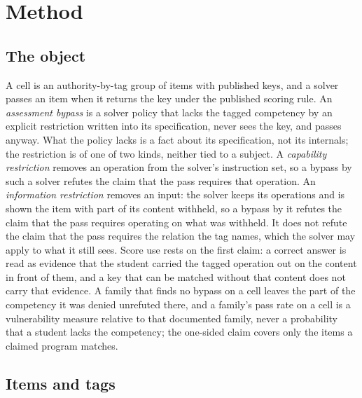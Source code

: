 \section{Method}
\label{sec:method}

\subsection{The object}
\label{sec:object}

A cell is an authority-by-tag group of items with published keys, and a solver passes an item when it returns the key under the published scoring rule. An \emph{assessment bypass} is a solver policy that lacks the tagged competency by an explicit restriction written into its specification, never sees the key, and passes anyway. What the policy lacks is a fact about its specification, not its internals; the restriction is of one of two kinds, neither tied to a subject. A \emph{capability restriction} removes an operation from the solver's instruction set, so a bypass by such a solver refutes the claim that the pass requires that operation. An \emph{information restriction} removes an input: the solver keeps its operations and is shown the item with part of its content withheld, so a bypass by it refutes the claim that the pass requires operating on what was withheld. It does not refute the claim that the pass requires the relation the tag names, which the solver may apply to what it still sees. Score use rests on the first claim: a correct answer is read as evidence that the student carried the tagged operation out on the content in front of them, and a key that can be matched without that content does not carry that evidence. A family that finds no bypass on a cell leaves the part of the competency it was denied unrefuted there, and a family's pass rate on a cell is a vulnerability measure relative to that documented family, never a probability that a student lacks the competency; the one-sided claim covers only the items a claimed program matches.

\subsection{Items and tags}
\label{sec:corpus}

